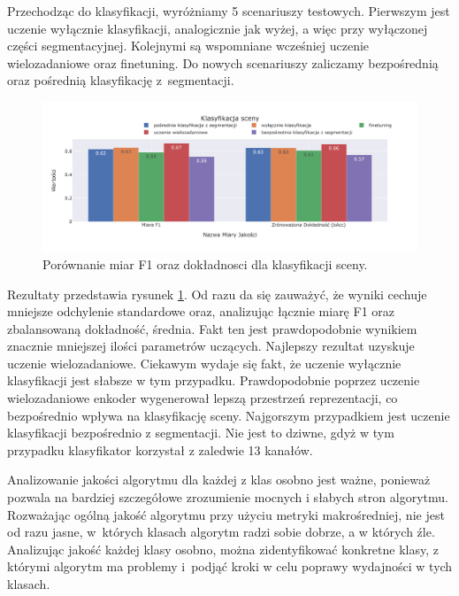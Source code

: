 \vspace{0.5cm}
Przechodząc do klasyfikacji, wyróżniamy 5 scenariuszy testowych. Pierwszym jest uczenie wyłącznie klasyfikacji, analogicznie jak wyżej, a więc przy wyłączonej części segmentacyjnej. Kolejnymi są wspomniane wcześniej uczenie wielozadaniowe oraz finetuning. Do nowych scenariuszy zaliczamy bezpośrednią oraz pośrednią klasyfikację z~segmentacji.
\begin{figure}[ht!]
    \centering
    \includegraphics[width=\textwidth]{img/pl-res/Klasyfikacja-sceny.jpeg}
    \caption{Porównanie miar F1 oraz dokładnosci dla klasyfikacji sceny.}
    \label{fig:macro-classification}
\end{figure}

Rezultaty przedstawia rysunek \ref{fig:macro-classification}. Od razu da się zauważyć, że wyniki cechuje mniejsze odchylenie standardowe oraz, analizując łącznie miarę F1 oraz zbalansowaną dokładność, średnia. Fakt ten jest prawdopodobnie wynikiem znacznie mniejszej ilości parametrów uczących. Najlepszy rezultat uzyskuje uczenie wielozadaniowe. Ciekawym wydaje się fakt, że uczenie wyłącznie klasyfikacji jest słabsze w tym przypadku. Prawdopodobnie poprzez uczenie wielozadaniowe enkoder wygenerował lepszą przestrzeń reprezentacji, co bezpośrednio wpływa na klasyfikację sceny. Najgorszym przypadkiem jest uczenie klasyfikacji bezpośrednio z segmentacji. Nie jest to dziwne, gdyż w tym przypadku klasyfikator korzystał z zaledwie 13 kanałów.
\vspace{0.5cm}

Analizowanie jakości algorytmu dla każdej z klas osobno jest ważne, ponieważ pozwala na bardziej szczegółowe zrozumienie mocnych i słabych stron algorytmu. Rozważając ogólną jakość algorytmu przy użyciu metryki makrośredniej, nie jest od razu jasne, w~których klasach algorytm radzi sobie dobrze, a w których źle. Analizując jakość każdej klasy osobno, można zidentyfikować konkretne klasy, z którymi algorytm ma problemy i~podjąć kroki w celu poprawy wydajności w tych klasach.

